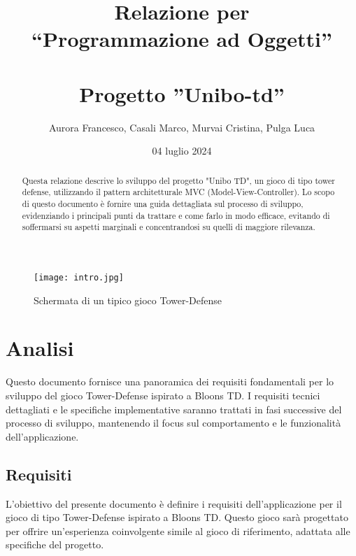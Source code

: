 \documentclass[a4paper,12pt]{report}
\title{Relazione per \\``Programmazione ad Oggetti'' \\ \\Progetto ''Unibo-td''}
\author{Aurora Francesco, Casali Marco, Murvai Cristina, Pulga Luca}
\date{04 luglio 2024}
\begin{document}
\maketitle

\begin{abstract}
Questa relazione descrive lo sviluppo del progetto "Unibo TD", un gioco di tipo tower defense, utilizzando il pattern architetturale MVC (Model-View-Controller). Lo scopo di questo documento è fornire una guida dettagliata sul processo di sviluppo, evidenziando i principali punti da trattare e come farlo in modo efficace, evitando di soffermarsi su aspetti marginali e concentrandosi su quelli di maggiore rilevanza.
\end{abstract}

\begin{figure}[H]
    \centering
    \texttt{[image: intro.jpg]}
    \caption{Schermata di un tipico gioco Tower-Defense}
    \label{fig:enter-label}
\end{figure}

\tableofcontents

\chapter{Analisi}

Questo documento fornisce una panoramica dei requisiti fondamentali per lo sviluppo del gioco Tower-Defense ispirato a Bloons TD. I requisiti tecnici dettagliati e le specifiche implementative saranno trattati in fasi successive del processo di sviluppo, mantenendo il focus sul comportamento e le funzionalità dell'applicazione.

\section{Requisiti}

L'obiettivo del presente documento è definire i requisiti dell'applicazione per il gioco di tipo Tower-Defense ispirato a Bloons TD. Questo gioco sarà progettato per offrire un'esperienza coinvolgente simile al gioco di riferimento, adattata alle specifiche del progetto.
\end{document}
